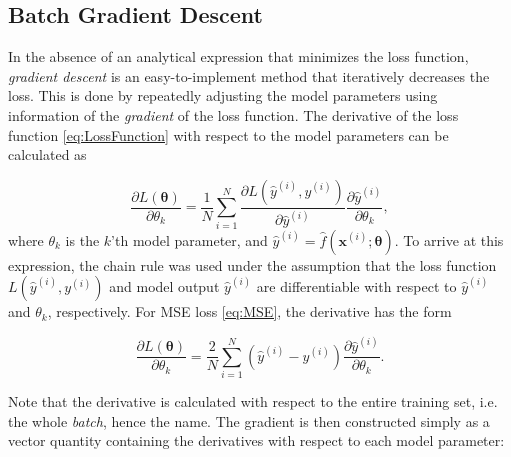 
\subsection{Batch Gradient Descent}\label{sec:GradientDescent}
In the absence of an analytical expression that minimizes the loss function, \emph{gradient descent} is an easy-to-implement method that iteratively decreases the loss. This is done by repeatedly adjusting the model parameters using information of the \emph{gradient} of the loss function. The derivative of the loss function \cref{eq:LossFunction} with respect to the model parameters can be calculated as

\begin{equation}\label{eq:LossDerivateWRTparameter}
    \frac{\partial L(\boldsymbol{\theta})}{\partial \theta_k}  =
    \frac{1}{N}\sum_{i=1}^{N} \frac{\partial L( \hat{y}^{(i)}, y^{(i)})}{\partial \hat{y}^{(i)}} 
    \frac{\partial \hat{y}^{(i)}}{\partial \theta_k},
\end{equation}
where $\theta_k$ is the $k$'th model parameter, and  $\hat{y}^{(i)} = \hat{f}(\boldsymbol{x}^{(i)}; \boldsymbol{\theta})$. To arrive at this expression, the chain rule was used under the assumption that the loss function $L(\hat{y}^{(i)}, y^{(i)})$ and model output $\hat{y}^{(i)}$ are differentiable with respect to $\hat{y}^{(i)}$ and $\theta_k$, respectively. For MSE loss \cref{eq:MSE}, the derivative has the form 

\begin{equation}\label{eq:LossDerivateWRTparameter}
    \frac{\partial L(\boldsymbol{\theta})}{\partial \theta_k}  =
    \frac{2}{N}\sum_{i=1}^{N} (\hat{y}^{(i)} - y^{(i)}) 
    \frac{\partial \hat{y}^{(i)}}{\partial \theta_k}.
\end{equation}

Note that the derivative is calculated with respect to the entire training set, i.e. the whole \emph{batch}, hence the name. The gradient is then constructed simply as a vector quantity containing the derivatives with respect to each model parameter:

